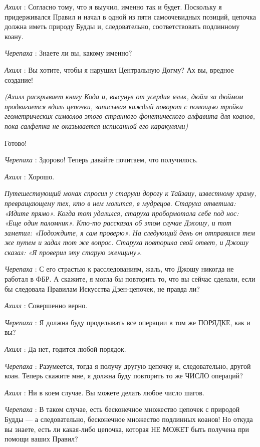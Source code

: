 \emph{Ахилл} : Согласно тому, что я выучил, именно так и будет. Поскольку я придерживался Правил и начал в одной из пяти самоочевидных позиций, цепочка должна иметь природу Будды и, следовательно, соответствовать подлинному коану.

\emph{Черепаха} : Знаете ли вы, какому именно?

\emph{Ахилл} : Вы хотите, чтобы я нарушил Центральную Догму? Ах вы, вредное создание!

\emph{(Ахилл раскрывает книгу Кода и, высунув от усердия язык, дюйм за дюймом продвигается вдоль цепочки, записывая каждый поворот с помощью тройки геометрических символов этого странного фонетического алфавита для коанов, пока салфетка не оказывается исписанной его каракулями)}

Готово!

\emph{Черепаха} : Здорово! Теперь давайте почитаем, что получилось.

\emph{Ахилл} : Хорошо.

\emph{Путешествующий монах спросил у старухи дорогу к Тайзаиу, известному храму, превращающему тех, кто в нем молится, в мудрецов. Старуха ответила: «Идите прямо». Когда тот удалился, старуха пробормотала себе под нос: «Еще один паломник». Кто-то рассказал об этом случае Джошу, и тот заметил: «Подождите, я сам проверю». На следующий день он отправился тем же путем и задал тот же вопрос. Старуха повторила свой ответ, и Джошу сказал: «Я проверил эту старую женщину».}

\emph{Черепаха} : С его страстью к расследованиям, жаль, что Джошу никогда не работал в ФБР. А скажите, я могла бы повторить то, что вы сейчас сделали, если бы следовала Правилам Искусства Дзен-цепочек, не правда ли?

\emph{Ахилл} : Совершенно верно.

\emph{Черепаха} : Я должна буду проделывать все операции в том же ПОРЯДКЕ, как и вы?

\emph{Ахилл} : Да нет, годится любой порядок.

\emph{Черепаха} : Разумеется, тогда я получу другую цепочку и, следовательно, другой коан. Теперь скажите мне, я должна буду повторить то же ЧИСЛО операций?

\emph{Ахилл} : Ни в коем случае. Вы можете делать любое число шагов.

\emph{Черепаха} : В таком случае, есть бесконечное множество цепочек с природой Будды --- а следовательно, бесконечное множество подлинных коанов! Но откуда вы знаете, есть ли какая-либо цепочка, которая НЕ МОЖЕТ быть получена при помощи ваших Правил?

